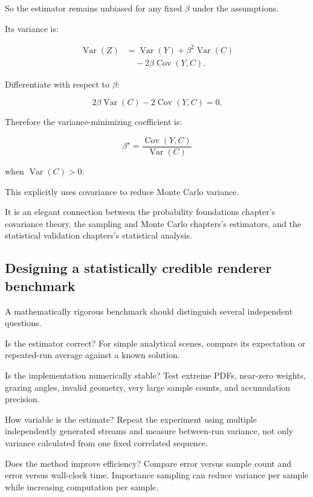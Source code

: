 So the estimator remains unbiased for any fixed \(\beta\) under the assumptions.

Its variance is:

\[
 \begin{aligned} \operatorname{Var}(Z) &= \operatorname{Var}(Y) +\beta^2\operatorname{Var}(C)\\ &\quad-2\beta\operatorname{Cov}(Y,C). \end{aligned}
\]

Differentiate with respect to \(\beta\):

\[
 2\beta\operatorname{Var}(C) -2\operatorname{Cov}(Y,C)=0.
\]

Therefore the variance-minimizing coefficient is:

\[
 \boxed{ \beta^\star= \frac{\operatorname{Cov}(Y,C)} {\operatorname{Var}(C)} }
\]

when \(\operatorname{Var}(C)>0\).

This explicitly uses covariance to reduce Monte Carlo variance.

It is an elegant connection between the probability foundations chapter's covariance theory, the sampling and Monte Carlo chapters's estimators, and the statistical validation chapters's statistical analysis.

\subsection{Designing a statistically credible renderer benchmark}\label{02-foundations-ii-ch031-designing-a-statistically-credible-renderer-benchmark}

\hypertarget{02-foundations-ii-ch031-designing-a-statistically-credible-renderer-benchmark}{}

A mathematically rigorous benchmark should distinguish several independent questions.

Is the estimator correct? For simple analytical scenes, compare its expectation or repeated-run average against a known solution.

Is the implementation numerically stable? Test extreme PDFs, near-zero weights, grazing angles, invalid geometry, very large sample counts, and accumulation precision.

How variable is the estimate? Repeat the experiment using multiple independently generated streams and measure between-run variance, not only variance calculated from one fixed correlated sequence.

Does the method improve efficiency? Compare error versus sample count and error versus wall-clock time. Importance sampling can reduce variance per sample while increasing computation per sample.

